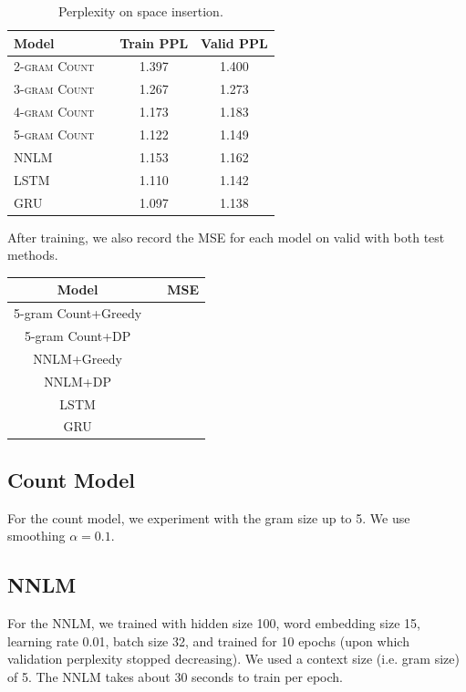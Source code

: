 \documentclass[11pt]{article}
\begin{document}
\begin{table}[h]
\centering
\begin{tabular}{llcc}
 \toprule
 Model &  & Train PPL & Valid PPL \\
 \midrule
 \textsc{2-gram Count} & &1.397 & 1.400 \\
 \textsc{3-gram Count} & &1.267 & 1.273 \\
 \textsc{4-gram Count} & &1.173 & 1.183  \\
 \textsc{5-gram Count} & &1.122 & 1.149 \\
 \textsc{NNLM} & & 1.153 & 1.162 \\
 \textsc{LSTM} & & 1.110 & 1.142 \\
 \textsc{GRU} &  & 1.097 & 1.138 \\
 \bottomrule
\end{tabular}
\caption{\label{tab:results} Perplexity on space insertion.}
\end{table}

After training, we also record the MSE for each model on valid with both test methods.

\begin{center}
  \begin{tabular}{ ccc}
    \hline Model &  & MSE \\
    \hline 5-gram Count+Greedy & \\
    5-gram Count+DP & \\
    NNLM+Greedy & \\
    NNLM+DP & \\
    LSTM &  & \\
    GRU &  & \\
    \hline
  \end{tabular}
\end{center}

\subsection{Count Model}

For the count model, we experiment with the gram size up to 5. We use smoothing $\alpha = 0.1$.

\subsection{NNLM}

For the NNLM, we trained with hidden size 100, word embedding size 15, learning rate 0.01, batch size 32, and trained for 10 epochs (upon which validation perplexity stopped decreasing). We used a context size (i.e. gram size) of 5. The NNLM takes about 30 seconds to train per epoch.
\end{document}

